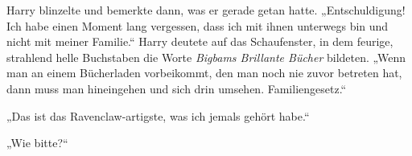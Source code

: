 Harry blinzelte und bemerkte dann, was er gerade getan hatte.
„Entschuldigung! Ich habe einen Moment lang vergessen, dass ich mit ihnen unterwegs bin und nicht mit meiner Familie.“ Harry deutete auf das Schaufenster, in dem feurige, strahlend helle Buchstaben die Worte \emph{Bigbams Brillante Bücher} bildeten.
„Wenn man an einem Bücherladen vorbeikommt, den man noch nie zuvor betreten hat, dann muss man hineingehen und sich drin umsehen. Familiengesetz.“

„Das ist das Ravenclaw-artigste, was ich jemals gehört habe.“

„Wie bitte?“

